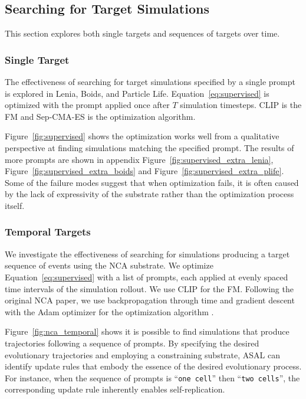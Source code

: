 \documentclass{article}
\begin{document}
\subsection{Searching for Target Simulations}
This section explores both single targets and sequences of targets over time.

\subsubsection{Single Target}
The effectiveness of searching for target simulations specified by a single prompt is explored in Lenia, Boids, and Particle Life.
Equation~\ref{eq:supervised} is optimized with the prompt applied once after $T$ simulation timesteps.
CLIP is the FM and Sep-CMA-ES \citep{ros2008simple} is the optimization algorithm.




Figure~\ref{fig:supervised} shows the optimization works well from a qualitative perspective at finding simulations matching the specified prompt.
The results of more prompts are shown in appendix Figure~\ref{fig:supervised_extra_lenia}, Figure~\ref{fig:supervised_extra_boids} and Figure~\ref{fig:supervised_extra_plife}.
Some of the failure modes suggest that when optimization fails, it is often caused by the lack of expressivity of the substrate rather than the optimization process itself.

\subsubsection{Temporal Targets}
We investigate the effectiveness of searching for simulations producing a target sequence of events using the NCA substrate.
We optimize Equation~\ref{eq:supervised} with a list of prompts, each applied at evenly spaced time intervals of the simulation rollout.
We use CLIP for the FM.
Following the original NCA paper, we use backpropagation through time and gradient descent with the Adam optimizer for the optimization algorithm \citep{mordvintsev2020growing}.

Figure~\ref{fig:nca_temporal} shows it is possible to find simulations that produce trajectories following a sequence of prompts.
By specifying the desired evolutionary trajectories and employing a constraining substrate, ASAL can identify update rules that embody the essence of the desired evolutionary process.
For instance, when the sequence of prompts is ``\texttt{one cell}'' then ``\texttt{two cells}'', the corresponding update rule inherently enables self-replication.
\end{document}
